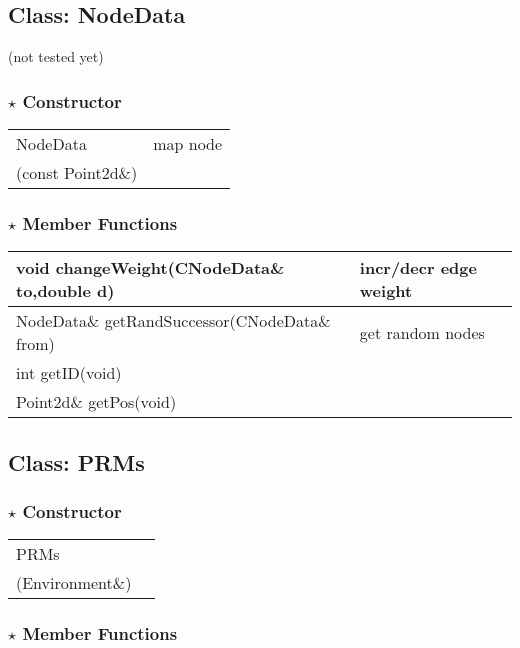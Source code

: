 \documentclass[onecolumn,10pt]{article}
\begin{document}
\subsection{Class: NodeData}
(not tested yet)

\subsubsection*{$\star$ Constructor}
\begin{tabular}{l|l}
NodeData           & map node\\
(const Point2d\&)
\end{tabular}

\subsubsection*{$\star$ Member Functions}

\begin{tabular}{l|l}
void changeWeight(CNodeData\& to,double d)    & incr/decr edge weight \\\hline
NodeData\& getRandSuccessor(CNodeData\& from) & get random nodes\\\hline
int getID(void) & \\\hline
Point2d\& getPos(void) &
\end{tabular}

\subsection{Class: PRMs}

\subsubsection*{$\star$ Constructor}
\begin{tabular}{l|l}
PRMs                 & \\
(Environment\&)
\end{tabular}

\subsubsection*{$\star$ Member Functions}
\end{document}
